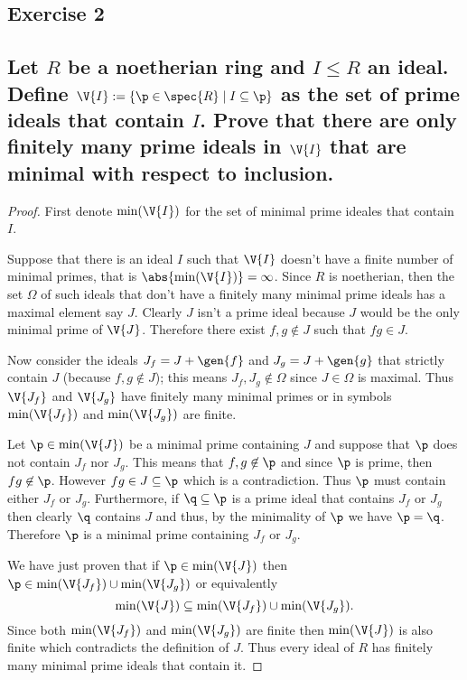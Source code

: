 \HRule
\subsection*{Exercise 2}
\subsection*{%
Let $R$ be a noetherian ring and $I\leq R$ an ideal. Define $\V{I}:=\{\p\in\spec{R}\mid I\subseteq\p\}$ as the set of
prime ideals that contain $I$. Prove that there are only finitely many prime ideals in $\V{I}$ that are minimal with
respect to inclusion.
} 

\begin{proof}%

First denote $\min(\V{I})$ for the set of minimal prime ideales that contain $I$.

Suppose that there is an ideal $I$ such that $\V{I}$ doesn't have a finite number of minimal primes, that is $\abs{\min(\V{I})}=\infty$.
Since $R$ is noetherian, then the set $\Omega$ of such ideals that don't have a finitely many minimal prime ideals has a maximal
element say $J$. Clearly $J$ isn't a prime ideal because $J$ would be the only minimal prime of $\V{J}$.
Therefore there exist $f,g\not\in J$ such that $fg\in J$. 

Now consider the ideals $J_f=J+\gen{f}$ and $J_g=J+\gen{g}$ that strictly contain $J$ (because $f,g\not\in J$); this
means $J_f,J_g\not\in\Omega$ since $J\in\Omega$ is maximal. Thus $\V{J_f}$ and $\V{J_g}$ have finitely many minimal primes
or in symbols $\min(\V{J_f})$ and $\min(\V{J_g})$ are finite.

Let $\p\in\min(\V{J})$ be a minimal prime containing $J$ and suppose that $\p$ does not contain $J_f$ nor $J_g$. This means that
$f,g\not\in\p$ and since $\p$ is prime, then $fg\not\in\p$. However $fg\in J\subseteq\p$ which is a contradiction. Thus $\p$
must contain either $J_f$ or $J_g$. Furthermore, if $\q\subseteq\p$ is a prime ideal that contains $J_f$ or $J_g$ then clearly
$\q$ contains $J$ and thus, by the minimality of $\p$ we have $\p=\q$. Therefore $\p$ is a minimal prime containing $J_f$ or $J_g$.

We have just proven that if $\p\in\min(\V{J})$ then $\p\in\min(\V{J_f})\cup\min(\V{J_g})$ or equivalently
\[
	\min(\V{J})\subseteq\min(\V{J_f}) \cup \min(\V{J_g}).
\]
Since both $\min(\V{J_f})$ and $\min(\V{J_g})$ are finite then $\min(\V{J})$ is also finite which contradicts the definition of
$J$. Thus every ideal of $R$ has finitely many minimal prime ideals that contain it.
%
\end{proof}%

